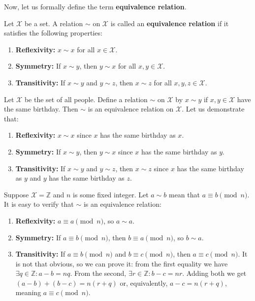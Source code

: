 \documentclass[../lecture-notes-148x210.tex]{subfiles}
\begin{document}
Now, let us formally define the term \textbf{equivalence relation}.

\begin{definition}
    Let $\mathcal{X}$ be a set. A relation $\sim$ on $\mathcal{X}$ is called an \textbf{equivalence relation} if it satisfies the following properties:
    \begin{enumerate}
        \item \textbf{Reflexivity:} $x \sim x$ for all $x \in \mathcal{X}$.
        \item \textbf{Symmetry:} If $x \sim y$, then $y \sim x$ for all $x,y \in \mathcal{X}$.
        \item \textbf{Transitivity:} If $x \sim y$ and $y \sim z$, then $x \sim z$ for all $x,y,z \in \mathcal{X}$.
    \end{enumerate}
\end{definition}

\begin{example}
    Let $\mathcal{X}$ be the set of all people. Define a relation $\sim$ on $\mathcal{X}$ by $x \sim y$ if $x,y \in \mathcal{X}$ have the same birthday. 
    Then $\sim$ is an equivalence relation on $\mathcal{X}$. Let us demonstrate that:
    \begin{enumerate}
        \item \textbf{Reflexivity:} $x \sim x$ since $x$ has the same birthday as $x$.
        \item \textbf{Symmetry:} If $x \sim y$, then $y \sim x$ since $x$ has the same birthday as $y$.
        \item \textbf{Transitivity:} If $x \sim y$ and $y \sim z$, then $x \sim z$ since $x$ has the same birthday as $y$ and $y$ has the same birthday as $z$.
    \end{enumerate}
\end{example}

\begin{example}
    Suppose $\mathcal{X} = \mathbb{Z}$ and $n$ is some fixed integer. Let $a \sim b$ mean that $a \equiv b \pmod{n}$. It is easy to verify that $\sim$ is an equivalence relation:
    \begin{enumerate}
        \item \textbf{Reflexivity:} $a \equiv a \pmod{n}$, so $a \sim a$.
        \item \textbf{Symmetry:} If $a \equiv b \pmod{n}$, then $b \equiv a \pmod{n}$, so $b \sim a$.
        \item \textbf{Transitivity:} If $a \equiv b \pmod{n}$ and $b \equiv c \pmod{n}$, then $a \equiv c \pmod{n}$. It is not that obvious, so we can prove it: from the first equality we have $\exists q \in \mathbb{Z}: a-b = nq$. From the second, $\exists r \in \mathbb{Z}: b-c = nr$. Adding both we get $(a-b)+(b-c) = n(r+q)$ or, equivalently, $a-c = n(r+q)$, meaning $a \equiv c \pmod{n}$.
    \end{enumerate}
\end{example}
\end{document}
